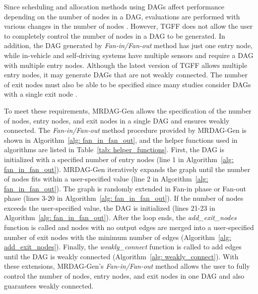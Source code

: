 Since scheduling and allocation methods using DAGs affect performance depending on the number of nodes in a DAG, evaluations are performed with various changes in the number of nodes \cite{senapati2021hmds, tong2020ql}.
However, TGFF does not allow the user to completely control the number of nodes in a DAG to be generated.
In addition, the DAG generated by {\it Fan-in/Fan-out} method has just one entry node, while in-vehicle and self-driving systems have multiple sensors \cite{verucchi2020latency,guanindustry} and require a DAG with multiple entry nodes.
Although the latest version of TGFF allows multiple entry nodes, it may generate DAGs that are not weakly connected.
The number of exit nodes must also be able to be specified since many studies consider DAGs with a single exit node \cite{cho2021conditionally, zhang2020efficient}.

To meet these requirements, MRDAG-Gen allows the specification of the number of nodes, entry nodes, and exit nodes in a single DAG and ensures weakly connected.
The {\it Fan-in/Fan-out} method procedure provided by MRDAG-Gen is shown in Algorithm~\ref{alg: fan_in_fan_out}, and the helper functions used in algorithms are listed in Table~\ref{tab: helper_functions}.
First, the DAG is initialized with a specified number of entry nodes (line 1 in Algorithm~\ref{alg: fan_in_fan_out}).
MRDAG-Gen iteratively expands the graph until the number of nodes fits within a user-specified value (line 2 in Algorithm~\ref{alg: fan_in_fan_out}).
The graph is randomly extended in Fan-in phase or Fan-out phase (lines 3-20 in Algorithm~\ref{alg: fan_in_fan_out}).
If the number of nodes exceeds the user-specified value, the DAG is initialized (lines 21-23 in Algorithm~\ref{alg: fan_in_fan_out}).
After the loop ends, the {\it add\_exit\_nodes} function is called and nodes with no output edges are merged into a user-specified number of exit nodes with the minimum number of edges (Algorithm~\ref{alg: add_exit_nodes}).
Finally, the {\it weakly\_connect} function is called to add edges until the DAG is weakly connected (Algorithm~\ref{alg: weakly_connect}).
With these extensions, MRDAG-Gen's {\it Fan-in/Fan-out} method allows the user to fully control the number of nodes, entry nodes, and exit nodes in one DAG and also guarantees weakly connected.


